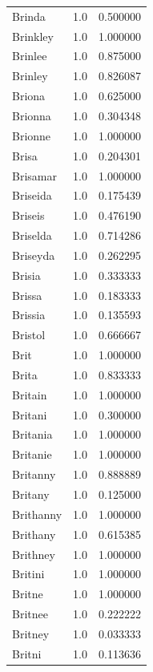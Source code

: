 \documentclass[
  letterpaper,
  DIV=11,
  numbers=noendperiod]{scrreprt}
\begin{document}
\begin{tabular}{lrr}
Brinda          &   1.0 &   0.500000 \\
Brinkley        &   1.0 &   1.000000 \\
Brinlee         &   1.0 &   0.875000 \\
Brinley         &   1.0 &   0.826087 \\
Briona          &   1.0 &   0.625000 \\
Brionna         &   1.0 &   0.304348 \\
Brionne         &   1.0 &   1.000000 \\
Brisa           &   1.0 &   0.204301 \\
Brisamar        &   1.0 &   1.000000 \\
Briseida        &   1.0 &   0.175439 \\
Briseis         &   1.0 &   0.476190 \\
Briselda        &   1.0 &   0.714286 \\
Briseyda        &   1.0 &   0.262295 \\
Brisia          &   1.0 &   0.333333 \\
Brissa          &   1.0 &   0.183333 \\
Brissia         &   1.0 &   0.135593 \\
Bristol         &   1.0 &   0.666667 \\
Brit            &   1.0 &   1.000000 \\
Brita           &   1.0 &   0.833333 \\
Britain         &   1.0 &   1.000000 \\
Britani         &   1.0 &   0.300000 \\
Britania        &   1.0 &   1.000000 \\
Britanie        &   1.0 &   1.000000 \\
Britanny        &   1.0 &   0.888889 \\
Britany         &   1.0 &   0.125000 \\
Brithanny       &   1.0 &   1.000000 \\
Brithany        &   1.0 &   0.615385 \\
Brithney        &   1.0 &   1.000000 \\
Britini         &   1.0 &   1.000000 \\
Britne          &   1.0 &   1.000000 \\
Britnee         &   1.0 &   0.222222 \\
Britney         &   1.0 &   0.033333 \\
Britni          &   1.0 &   0.113636 \\

\end{tabular}
\end{document}
